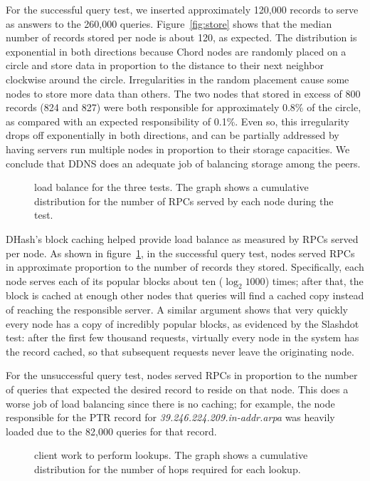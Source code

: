 For the successful query test, we inserted approximately 120,000
records to serve as answers to the 260,000 queries.
Figure~\ref{fig:store} shows that the median number of
records stored per node is about 120, as expected.
The distribution is exponential in both directions because
Chord nodes are randomly placed on a circle and store data
in proportion to the distance to their next neighbor clockwise
around the circle.  Irregularities in the random placement cause
some nodes to store more data than others.
The two nodes that stored in excess of 800
records (824 and 827) were both responsible for approximately
0.8\% of the circle, as compared with an expected 
responsibility of 0.1\%.
Even so, this irregularity drops off exponentially in both
directions, and can be partially addressed by having servers
run multiple nodes in proportion to their storage capacities.
We conclude that DDNS does an adequate job of balancing
storage among the peers.

\begin{figure}
\caption{load balance for the three tests.
The graph shows a cumulative distribution for the number
of RPCs served by each node during the test.}
\label{fig:both-rpc}
\end{figure}

DHash's block caching helped provide load balance as
measured by RPCs served per node.
As shown in figure~\ref{fig:both-rpc},
in the successful query test, nodes served RPCs in
approximate proportion to the number of records they stored.
Specifically, each node serves each of its popular blocks about
ten ($\log_2 1000$) times; after that, the block is cached
at enough other nodes that queries will find a cached copy
instead of reaching the responsible server.
A similar argument shows that very quickly every node has
a copy of incredibly popular blocks, as evidenced by the
Slashdot test: after the first few thousand requests, virtually
every node in the system has the record cached, so that
subsequent requests never leave the originating node.

For the unsuccessful query test, nodes served RPCs in 
proportion to the number of queries that expected the
desired record to reside on that node.
This does a worse job of load balancing since there is
no caching; for example, the node responsible for the
PTR record for {\em 39.246.224.209.in-addr.arpa} was
heavily loaded due to the 82,000 queries for that record.

\begin{figure}
\caption{client work to perform lookups. 
The graph shows a cumulative distribution for the number
of hops required for each lookup.}
\label{fig:hops}
\end{figure}

